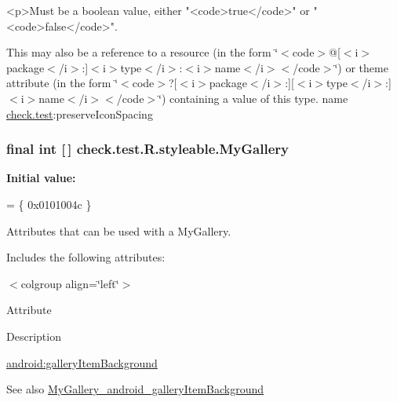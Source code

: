 \begin{DoxyVerb}      <p>Must be a boolean value, either "<code>true</code>" or "<code>false</code>".
\end{DoxyVerb}
 

This may also be a reference to a resource (in the form \char`\"{}$<$code$>$@\mbox{[}$<$i$>$package$<$/i$>$\+:\mbox{]}$<$i$>$type$<$/i$>$\+:$<$i$>$name$<$/i$>$$<$/code$>$\char`\"{}) or theme attribute (in the form \char`\"{}$<$code$>$?\mbox{[}$<$i$>$package$<$/i$>$\+:\mbox{]}\mbox{[}$<$i$>$type$<$/i$>$\+:\mbox{]}$<$i$>$name$<$/i$>$$<$/code$>$\char`\"{}) containing a value of this type.  name \hyperlink{namespacecheck_1_1test}{check.\+test}\+:preserve\+Icon\+Spacing \hypertarget{classcheck_1_1test_1_1_r_1_1styleable_a9c0880eccc65c48e229a8b4611d2b30f}{}
\subsubsection[{My\+Gallery}]{\setlength{\rightskip}{0pt plus 5cm}final int \mbox{[}$\,$\mbox{]} check.\+test.\+R.\+styleable.\+My\+Gallery\hspace{0.3cm}{\ttfamily [static]}}\label{classcheck_1_1test_1_1_r_1_1styleable_a9c0880eccc65c48e229a8b4611d2b30f}
{\bfseries Initial value\+:}
\begin{DoxyCode}
= \{
            0x0101004c
        \}
\end{DoxyCode}
Attributes that can be used with a My\+Gallery. 

Includes the following attributes\+:

\begin{TabularC}{0}
\hline
\end{TabularC}
$<$colgroup align=\char`\"{}left\char`\"{}$>$ 

Attribute

Description 

{\ttfamily \hyperlink{classcheck_1_1test_1_1_r_1_1styleable_a289156879224bdba08596f12f78a9a86}{android\+:gallery\+Item\+Background}}

\begin{DoxySeeAlso}{See also}
\hyperlink{classcheck_1_1test_1_1_r_1_1styleable_a289156879224bdba08596f12f78a9a86}{My\+Gallery\+\_\+android\+\_\+gallery\+Item\+Background} 
\end{DoxySeeAlso}
\hypertarget{classcheck_1_1test_1_1_r_1_1styleable_a289156879224bdba08596f12f78a9a86}{}
